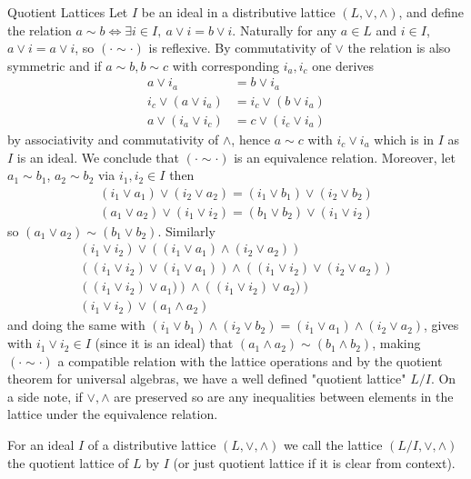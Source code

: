 \begin{subsection}{Quotient Lattices}
    Let \( I \) be an ideal in a distributive lattice \( (L, \vee, \wedge) \),
    and define the relation \( a \sim b \iff \exists i \in I,\ a \vee i = b \vee i\).
    Naturally for any \( a \in L \) and \( i \in I \), \( a \vee i = a \vee i \),
    so \( (\cdot \sim \cdot) \) is reflexive. By commutativity of \( \vee \) the relation is also symmetric
    and if \( a \sim b, b \sim c \) with corresponding \( i_a, i_c \) one derives
    \begin{align*}
        a \vee i_a &= b \vee i_a \\
        i_c \vee (a \vee i_a) &= i_c \vee (b \vee i_a) \\
        a \vee (i_a \vee i_c) &= c \vee (i_c \vee i_a)
    \end{align*}
    by associativity and commutativity of \( \wedge \), hence \( a \sim c \) with \( i_c \vee i_a \)
    which is in \( I \) as \( I \) is an ideal.
    We conclude that \( (\cdot \sim \cdot) \) is an equivalence relation.
    Moreover, let \( a_1 \sim b_1 \), \( a_2 \sim b_2 \) via \( i_1, i_2 \in I \)
    then 
    \begin{align*}
        (i_1 \vee a_1) \vee (i_2 \vee a_2) = (i_1 \vee b_1) \vee (i_2 \vee b_2) \\
        (a_1 \vee a_2) \vee (i_1 \vee i_2) = (b_1 \vee b_2) \vee (i_1 \vee i_2)
    \end{align*}
    so \( (a_1 \vee a_2) \sim (b_1 \vee b_2) \). Similarly
    \begin{align*}
        (i_1 \vee i_2) \vee \left( (i_1 \vee a_1) \wedge (i_2 \vee a_2) \right)  \\
     \left ( (i_1 \vee i_2) \vee (i_1 \vee a_1) \right) \wedge \left( (i_1 \vee i_2) \vee (i_2 \vee a_2) \right)  \\
     \left ( (i_1 \vee i_2) \vee a_1) \right) \wedge \left( (i_1 \vee i_2) \vee a_2) \right) \\
     (i_1 \vee i_2) \vee (a_1 \wedge a_2)
    \end{align*}
    and doing the same with \( (i_1 \vee b_1) \wedge (i_2 \vee b_2) = (i_1 \vee a_1) \wedge (i_2 \vee a_2) \), gives 
    with \( i_1 \vee i_2 \in I  \) (since it is an ideal) that \( (a_1 \wedge a_2) \sim (b_1 \wedge b_2) \), making \( (\cdot \sim \cdot) \) 
    a compatible relation with the lattice operations and by the quotient theorem for universal algebras,
    we have a well defined "quotient lattice" \( L / I \). On a side note, if \( \vee, \wedge \) are preserved
    so are any inequalities between elements in the lattice under the equivalence relation.
    \begin{definition} \label{defquotlat}
        For an ideal \( I \) of a distributive lattice \( (L, \vee, \wedge) \)
        we call the lattice \( (L / I, \vee, \wedge) \) the quotient lattice of \( L \)
        by \( I \) (or just quotient lattice if it is clear from context).
    \end{definition}


\end{subsection}
